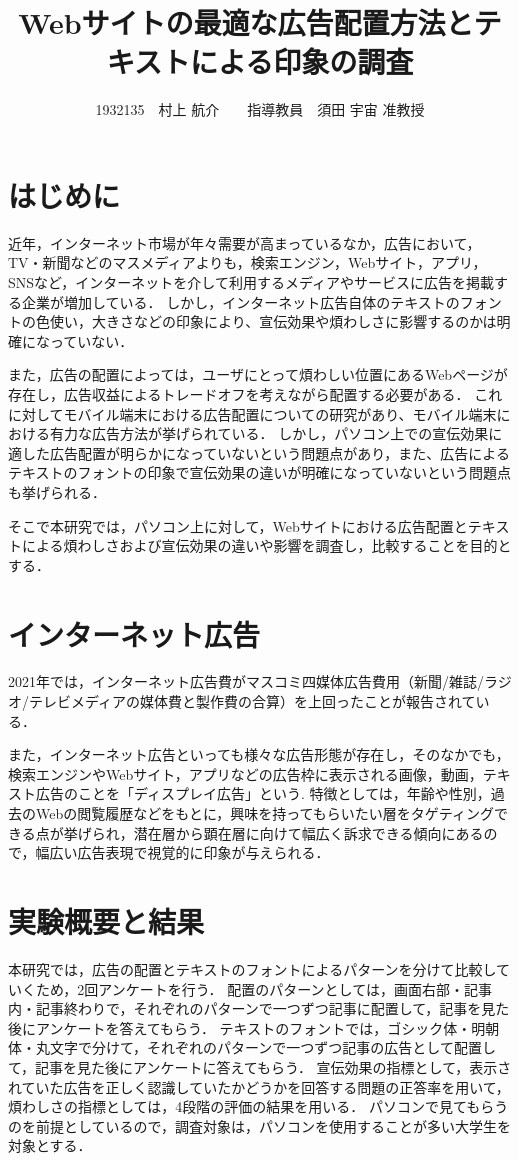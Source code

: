 \documentclass[twocolumn,10pt,a4j]{ltjsarticle}
\title{Webサイトの最適な広告配置方法とテキストによる印象の調査}
\author{1932135　村上 航介　　指導教員　須田 宇宙 准教授}
\date{}
\begin{document}
\maketitle

\section{はじめに}
近年，インターネット市場が年々需要が高まっているなか，広告において，TV・新聞などのマスメディアよりも，検索エンジン，Webサイト，アプリ，SNSなど，インターネットを介して利用するメディアやサービスに広告を掲載する企業が増加している．
しかし，インターネット広告自体のテキストのフォントの色使い，大きさなどの印象により、宣伝効果や煩わしさに影響するのかは明確になっていない．

また，広告の配置によっては，ユーザにとって煩わしい位置にあるWebページが存在し，広告収益によるトレードオフを考えながら配置する必要がある．
これに対してモバイル端末における広告配置についての研究があり、モバイル端末における有力な広告方法が挙げられている\cite{mobile}．
しかし，パソコン上での宣伝効果に適した広告配置が明らかになっていないという問題点があり，また、広告によるテキストのフォントの印象で宣伝効果の違いが明確になっていないという問題点も挙げられる．

そこで本研究では，パソコン上に対して，Webサイトにおける広告配置とテキストによる煩わしさおよび宣伝効果の違いや影響を調査し，比較することを目的とする．

\section{インターネット広告}
2021年では，インターネット広告費がマスコミ四媒体広告費用（新聞/雑誌/ラジオ/テレビメディアの媒体費と製作費の合算）を上回ったことが報告されている\cite{dentsu}．

また，インターネット広告といっても様々な広告形態が存在し，そのなかでも，検索エンジンやWebサイト，アプリなどの広告枠に表示される画像，動画，テキスト広告のことを「ディスプレイ広告」という.
特徴としては，年齢や性別，過去のWebの閲覧履歴などをもとに，興味を持ってもらいたい層をタゲティングできる点が挙げられ，潜在層から顕在層に向けて幅広く訴求できる傾向にあるので，幅広い広告表現で視覚的に印象が与えられる．

\section{実験概要と結果}
本研究では，広告の配置とテキストのフォントによるパターンを分けて比較していくため，2回アンケートを行う．
配置のパターンとしては，画面右部・記事内・記事終わりで，それぞれのパターンで一つずつ記事に配置して，記事を見た後にアンケートを答えてもらう．
テキストのフォントでは，ゴシック体・明朝体・丸文字で分けて，それぞれのパターンで一つずつ記事の広告として配置して，記事を見た後にアンケートに答えてもらう．
宣伝効果の指標として，表示されていた広告を正しく認識していたかどうかを回答する問題の正答率を用いて，煩わしさの指標としては，4段階の評価の結果を用いる．
パソコンで見てもらうのを前提としているので，調査対象は，パソコンを使用することが多い大学生を対象とする．
\end{document}
